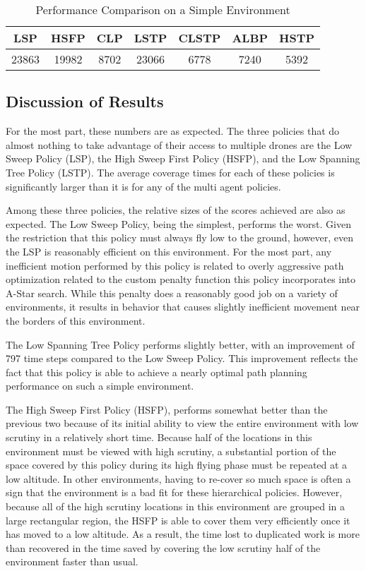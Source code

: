 \begin{table}[h]
\begin{center}
 \begin{tabular}{||c c c c c c c ||}
 \hline
 LSP   & HSFP  & CLP & LSTP & CLSTP & ALBP & HSTP \\
 \hline
 23863 & 19982 & 8702 & 23066 & 6778 & 7240 & 5392 \\
 \hline
 \end{tabular}
\end{center}
\caption{Performance Comparison on a Simple Environment}
\end{table}

\subsection{Discussion of Results}

For the most part, these numbers are as expected. The three policies that do almost nothing to take advantage of their access to multiple drones are the Low Sweep Policy (LSP), the High Sweep First Policy (HSFP), and the Low Spanning Tree Policy (LSTP). The average coverage times for each of these policies is significantly larger than it is for any of the multi agent policies.

Among these three policies, the relative sizes of the scores achieved are also as expected. The Low Sweep Policy, being the simplest, performs the worst. Given the restriction that this policy must always fly low to the ground, however, even the LSP is reasonably efficient on this environment. For the most part, any inefficient motion performed by this policy is related to overly aggressive path optimization related to the custom penalty function this policy incorporates into A-Star search. While this penalty does a reasonably good job on a variety of environments, it results in behavior that causes slightly inefficient movement near the borders of this environment.

The Low Spanning Tree Policy performs slightly better, with an improvement of 797 time steps compared to the Low Sweep Policy. This improvement reflects the fact that this policy is able to achieve a nearly optimal path planning performance on such a simple environment.

The High Sweep First Policy (HSFP), performs somewhat better than the previous two because of its initial ability to view the entire environment with low scrutiny in a relatively short time. Because half of the locations in this environment must be viewed with high scrutiny, a substantial portion of the space covered by this policy during its high flying phase must be repeated at a low altitude. In other environments, having to re-cover so much space is often a sign that the environment is a bad fit for these hierarchical policies. However, because all of the high scrutiny locations in this environment are grouped in a large rectangular region, the HSFP is able to cover them very efficiently once it has moved to a low altitude. As a result, the time lost to duplicated work is more than recovered in the time saved by covering the low scrutiny half of the environment faster than usual.

